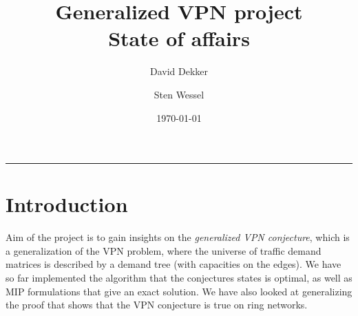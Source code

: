\documentclass[11pt]{article}
\title{\textbf{Generalized VPN project}\\State of affairs}
\author{David Dekker \and Sten Wessel}
\date{\today}
\begin{document}
    \maketitle
    \hrule


    \section{Introduction}
    Aim of the project is to gain insights on the \emph{generalized VPN conjecture}, which is a generalization of the VPN problem, where the universe of traffic demand matrices is described by a demand tree (with capacities on the edges).
    We have so far implemented the algorithm that the conjectures states is optimal, as well as MIP formulations that give an exact solution.
    We have also looked at generalizing the proof that shows that the VPN conjecture is true on ring networks.
\end{document}
